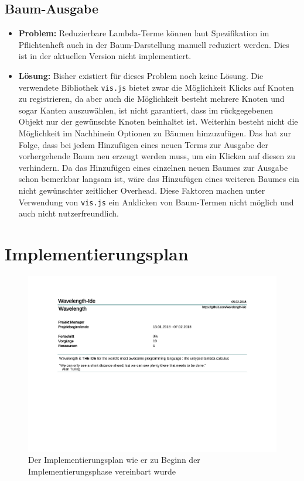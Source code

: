 \documentclass[parskip=full,11pt]{scrartcl}
\begin{document}
\subsection{Baum-Ausgabe}
\begin{itemize}
\item[] \textbf{Problem:} Reduzierbare Lambda-Terme können laut Spezifikation im Pflichtenheft auch in der Baum-Darstellung manuell reduziert werden. Dies ist in der aktuellen Version nicht implementiert.
\item[] \textbf{Lösung:} Bisher existiert für dieses Problem noch keine Lösung. Die verwendete Bibliothek \texttt{vis.js} bietet zwar die Möglichkeit Klicks auf Knoten zu registrieren, da aber auch die Möglichkeit besteht mehrere Knoten und sogar Kanten auszuwählen, ist nicht garantiert, dass im rückgegebenen Objekt nur der gewünschte Knoten beinhaltet ist. Weiterhin besteht nicht die Möglichkeit im Nachhinein Optionen zu Bäumen hinzuzufügen. Das hat zur Folge, dass bei jedem Hinzufügen eines neuen Terms zur Ausgabe der vorhergehende Baum neu erzeugt werden muss, um ein Klicken auf diesen zu verhindern. Da das Hinzufügen eines einzelnen neuen Baumes zur Ausgabe schon bemerkbar langsam ist, wäre das Hinzufügen eines weiteren Baumes ein nicht gewünschter zeitlicher Overhead.
Diese Faktoren machen unter Verwendung von \texttt{vis.js} ein Anklicken von Baum-Termen nicht möglich und auch nicht nutzerfreundlich. 

\end{itemize}


\newpage
\section{Implementierungsplan}
\begin{figure}[h]
\includegraphics[trim={0, 9.5cm, 0, 0}, clip, width=1.2\textwidth , page=4, center]{Implementierungsplan/Implementierungsplan-vorher.pdf}
\caption{Der Implementierungsplan wie er zu Beginn der Implementierungsphase vereinbart wurde}
\end{figure}
\end{document}

